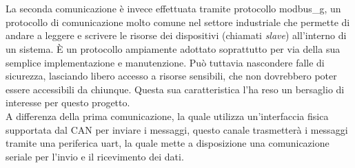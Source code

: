 \\\\
\noindent
La seconda comunicazione è invece effettuata tramite protocollo \gls{modbus_g}, un protocollo di comunicazione molto comune nel settore industriale che permette di andare a leggere e scrivere le risorse dei dispositivi (chiamati \textit{slave}) all'interno di un sistema.
È un protocollo ampiamente adottato soprattutto per via della sua semplice implementazione e manutenzione.
Può tuttavia nascondere falle di sicurezza, lasciando libero accesso a risorse sensibili, che non dovrebbero poter essere accessibili da chiunque.
Questa sua caratteristica l'ha reso un bersaglio di interesse per questo progetto.\\
A differenza della prima comunicazione, la quale utilizza un'interfaccia fisica supportata dal CAN per inviare i messaggi, questo canale trasmetterà i messaggi tramite una periferica \gls{uart}, la quale mette a disposizione una comunicazione seriale per l'invio e il ricevimento dei dati.


